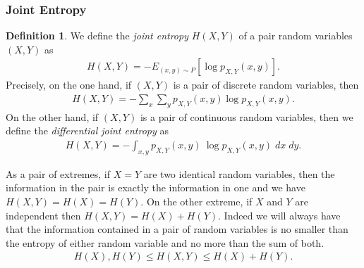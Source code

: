 \documentclass[a4paper,12pt]{article}
\theoremstyle{definition}
\newtheorem*{definition}{Definition}
\begin{document}
\subsubsection*{Joint Entropy}
\begin{definition}
    We define the \emph{joint entropy} $H(X,Y)$ of a pair random variables $(X,Y)$ as
    \begin{align*}
        H(X, Y) = -E_{(x, y) \sim P} [\log p_{X, Y}(x, y)].
    \end{align*}
    Precisely, on the one hand, if $(X,Y)$ is a pair of discrete random variables, then
    \begin{align*}
        H(X, Y) = - \sum_{x} \sum_{y} p_{X, Y}(x, y) \log p_{X, Y}(x, y).
    \end{align*}
    On the other hand, if $(X,Y)$ is a pair of continuous random variables, then we define 
    the \emph{differential joint entropy} as
    \begin{align*}
        H(X, Y) = - \int_{x, y} p_{X, Y}(x, y) \ \log p_{X, Y}(x, y) \;dx \;dy.
    \end{align*}
\end{definition}
As a pair of extremes, if $X = Y$ are two identical random variables, then the information 
in the pair is exactly the information in one and we have $H(X, Y) = H(X) = H(Y)$. On the
other extreme, if $X$ and $Y$ are independent then $H(X,Y) = H(X) + H(Y)$. Indeed we will 
always have that the information contained in a pair of random variables is no smaller than 
the entropy of either random variable and no more than the sum of both.
\begin{align*}
    H(X), H(Y) \le H(X, Y) \le H(X) + H(Y).
\end{align*}
\end{document}
